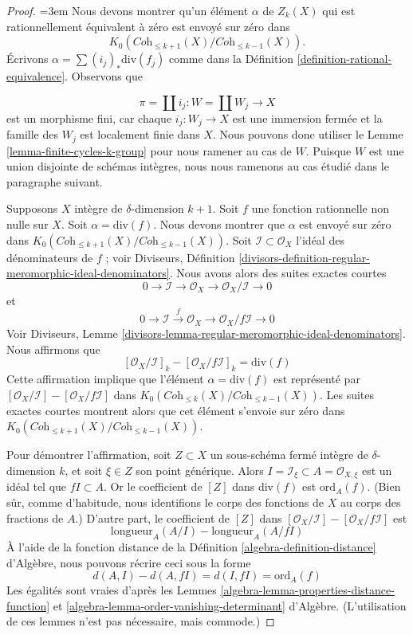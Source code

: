 \begin{proof}
{\emergencystretch=3em Nous devons montrer qu'un élément $\alpha$ de $Z_k(X)$ qui est rationnellement
équivalent à zéro est envoyé sur zéro dans
$$
K_0(\textit{Coh}_{\leq k + 1}(X)/\textit{Coh}_{\leq k - 1}(X)).
$$
Écrivons $\alpha = \sum (i_j)_*\text{div}(f_j)$ comme dans la
Définition \ref{definition-rational-equivalence}.
Observons que\par}
$$
\pi = \coprod i_j : W = \coprod W_j \longrightarrow X
$$
est un morphisme fini, car chaque $i_j : W_j \to X$ est une immersion fermée
et la famille des $W_j$ est localement finie dans $X$. Nous pouvons donc utiliser le
Lemme \ref{lemma-finite-cycles-k-group} pour nous ramener au cas de $W$.
Puisque $W$ est une union disjointe de schémas intègres, nous nous ramenons
au cas étudié dans le paragraphe suivant.

\medskip\noindent
Supposons $X$ intègre de $\delta$-dimension $k + 1$.
Soit $f$ une fonction rationnelle non nulle sur $X$.
Soit $\alpha = \text{div}(f)$. Nous devons montrer que
$\alpha$ est envoyé sur zéro dans
$K_0(\textit{Coh}_{\leq k + 1}(X)/\textit{Coh}_{\leq k - 1}(X))$.
Soit $\mathcal{I} \subset \mathcal{O}_X$ l'idéal des dénominateurs
de $f$ ; voir Diviseurs, Définition
\ref{divisors-definition-regular-meromorphic-ideal-denominators}.
Nous avons alors des suites exactes courtes
$$
0 \to \mathcal{I} \to \mathcal{O}_X \to \mathcal{O}_X/\mathcal{I} \to 0
$$
et
$$
0 \to \mathcal{I} \xrightarrow{f} \mathcal{O}_X \to
\mathcal{O}_X/f\mathcal{I} \to 0
$$
Voir Diviseurs, Lemme
\ref{divisors-lemma-regular-meromorphic-ideal-denominators}.
Nous affirmons que
$$
[\mathcal{O}_X/\mathcal{I}]_k - [\mathcal{O}_X/f\mathcal{I}]_k =
\text{div}(f)
$$
Cette affirmation implique que l'élément $\alpha = \text{div}(f)$ est représenté par
$[\mathcal{O}_X/\mathcal{I}] - [\mathcal{O}_X/f\mathcal{I}]$
dans $K_0(\textit{Coh}_{\leq k}(X)/\textit{Coh}_{\leq k - 1}(X))$.
Les suites exactes courtes montrent alors que cet élément s'envoie sur
zéro dans $K_0(\textit{Coh}_{\leq k + 1}(X)/\textit{Coh}_{\leq k - 1}(X))$.

\medskip\noindent
Pour démontrer l'affirmation, soit $Z \subset X$ un sous-schéma fermé intègre
de $\delta$-dimension $k$, et soit $\xi \in Z$ son point générique.
Alors $I = \mathcal{I}_\xi \subset A = \mathcal{O}_{X, \xi}$
est un idéal tel que $fI \subset A$. Or le coefficient de
$[Z]$ dans $\text{div}(f)$ est $\text{ord}_A(f)$. (Bien sûr, comme d'habitude,
nous identifions le corps des fonctions de $X$ au corps des fractions de $A$.)
D'autre part, le coefficient de $[Z]$ dans
$[\mathcal{O}_X/\mathcal{I}] - [\mathcal{O}_X/f\mathcal{I}]$
est
$$
\text{longueur}_A(A/I) - \text{longueur}_A(A/fI)
$$
À l'aide de la fonction distance de la
Définition \ref{algebra-definition-distance} d'Algèbre,
nous pouvons récrire ceci sous la forme
$$
d(A, I) - d(A, fI) = d(I, fI) = \text{ord}_A(f)
$$
Les égalités sont vraies d'après les Lemmes
\ref{algebra-lemma-properties-distance-function} et
\ref{algebra-lemma-order-vanishing-determinant} d'Algèbre.
(L'utilisation de ces lemmes n'est pas nécessaire, mais commode.)
\end{proof}


